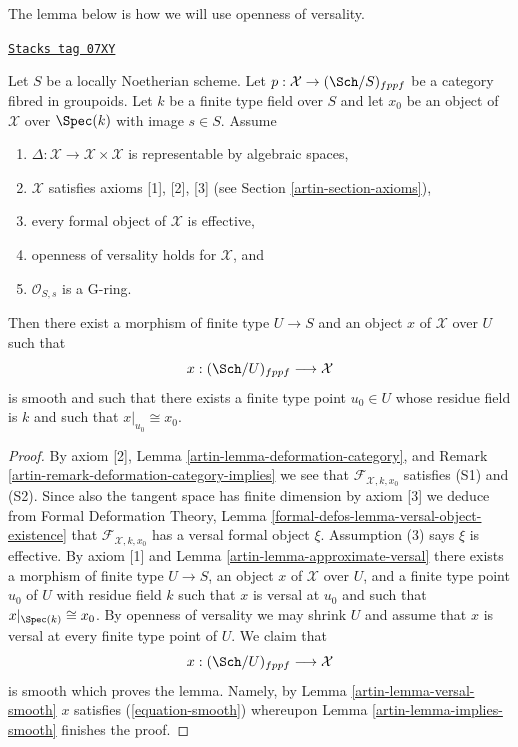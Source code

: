 The lemma below is how we will use openness of versality.

\begin{lemma}
\label{artin-lemma-get-smooth}
\href{https://stacks.math.columbia.edu/tag/07XY}{\texttt{Stacks tag 07XY}}

Let $S$ be a locally Noetherian scheme. Let
$p : \mathcal{X} \to (\Sch/S)_{fppf}$ be a category fibred in groupoids.
Let $k$ be a finite type field over $S$ and let $x_0$ be an object of
$\mathcal{X}$ over $\Spec(k)$ with image $s \in S$. Assume
\begin{enumerate}
\item $\Delta : \mathcal{X} \to \mathcal{X} \times \mathcal{X}$ is
representable by algebraic spaces,
\item $\mathcal{X}$ satisfies axioms [1], [2], [3] (see
Section \ref{artin-section-axioms}),
\item every formal object of $\mathcal{X}$ is effective,
\item openness of versality holds for $\mathcal{X}$, and
\item $\mathcal{O}_{S, s}$ is a G-ring.
\end{enumerate}
Then there exist a morphism of finite type $U \to S$ and an object
$x$ of $\mathcal{X}$ over $U$ such that
$$
x : (\Sch/U)_{fppf} \longrightarrow \mathcal{X}
$$
is smooth and such that there exists a finite type point $u_0 \in U$
whose residue field is $k$ and such that $x|_{u_0} \cong x_0$.
\end{lemma}

\begin{proof}

By axiom [2], Lemma \ref{artin-lemma-deformation-category}, and
Remark \ref{artin-remark-deformation-category-implies}
we see that $\mathcal{F}_{\mathcal{X}, k, x_0}$ satisfies (S1) and (S2).
Since also the tangent space has finite dimension by axiom [3]
we deduce from Formal Deformation Theory, Lemma
\ref{formal-defos-lemma-versal-object-existence}
that $\mathcal{F}_{\mathcal{X}, k, x_0}$ has a versal formal object $\xi$.
Assumption (3) says $\xi$ is effective. By axiom [1] and
Lemma \ref{artin-lemma-approximate-versal}
there exists a morphism of finite type $U \to S$, an object $x$ of
$\mathcal{X}$ over $U$, and a finite type point $u_0$ of $U$ with residue
field $k$ such that $x$ is versal at $u_0$ and such that
$x|_{\Spec(k)} \cong x_0$. By openness of versality we may shrink
$U$ and assume that $x$ is versal at every finite type point of $U$.
We claim that
$$
x : (\Sch/U)_{fppf} \longrightarrow \mathcal{X}
$$
is smooth which proves the lemma. Namely, by Lemma \ref{artin-lemma-versal-smooth}
$x$ satisfies (\ref{equation-smooth})
whereupon Lemma \ref{artin-lemma-implies-smooth}
finishes the proof.
\end{proof}

